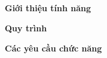 
\subsection{} 

\noindent \textbf{Giới thiệu tính năng}

\noindent \textbf{Quy trình}

\noindent \textbf{Các yêu cầu chức năng}